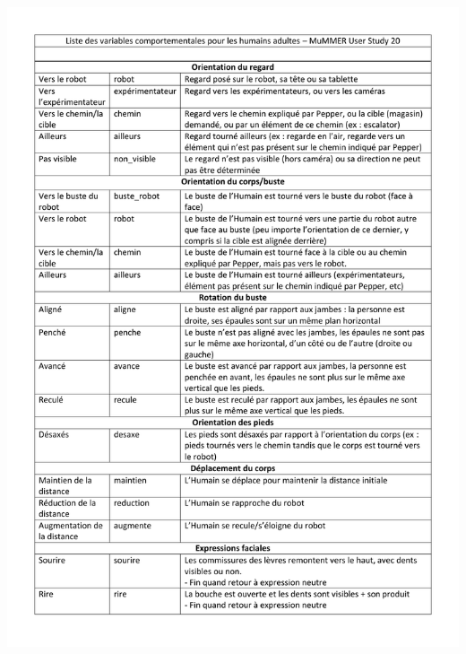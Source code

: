 \begin{center}
	\includegraphics[page=2, width=\textwidth]{figures/annexe1/HUMAINrepertoirecomportemental_MuMMER.pdf} 
\end{center}